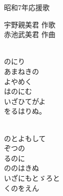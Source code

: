 \documentclass[10pt,b5j]{tarticle} %
\begin{document}
\begin{minipage}[c]{0.7\hsize} %
    \begin{center}
        {\LARGE
            昭和7年応援歌 %
        }
        {\small 
        }
    \end{center}
\end{minipage}
\begin{minipage}[c]{0.3\hsize} %
    \begin{flushright} %
        宇野親美君 作歌\\赤池武美君 作曲 %
    \end{flushright}
\end{minipage}

\vspace{1.5em} %
\newcommand{\linespace}{0.5em} %
\newcommand{\blocksize}{0.5\hsize} %
\newcommand{\itemmargin}{6em} %
\begin{enumerate} %
    \setlength{\itemindent}{\itemmargin} %
    \begin{minipage}[c]{\blocksize}
    
        \vspace{\linespace}
        \item~\\
        のにり\\
        あまねきの\\
        よやめく\\
        はのにむ\\
        いざひてがよ\\
        をるはりぬ。
        
        \vspace{\linespace}
        \item~\\
        のとよもして\\
        ぞつの\\
        るのに\\
        ののはきぬ\\
        いざにもとゞろと\\
        くのをえん
    
    \end{minipage}
\end{enumerate} %
\end{document}
